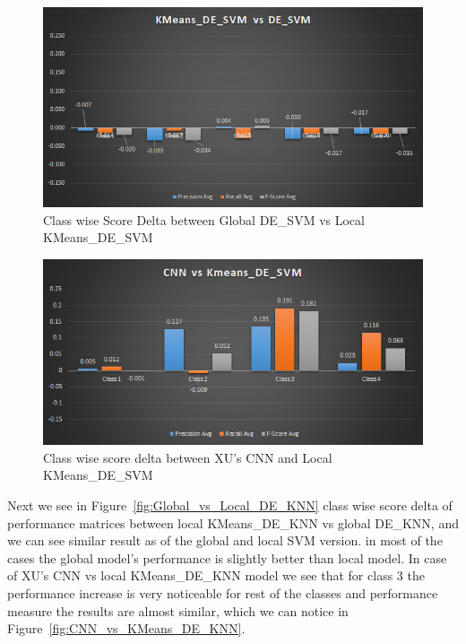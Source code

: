 \documentclass[sigconf]{acmart}
\theoremstyle{break}
\begin{document}
    \begin{figure}
        \centering
        \includegraphics[width=\linewidth]{fig/de_vs_KMenas.png}
        \caption{Class wise Score Delta between Global DE\_SVM vs Local KMeans\_DE\_SVM}
        \label{fig:Global_vs_Local_DE_SVM}
    \end{figure}
    
    \begin{figure}
        \centering
        \includegraphics[width=\linewidth]{fig/cnn_vs_Kmeans.png}
        \caption{Class wise score delta between XU's CNN and Local KMeans\_DE\_SVM}
        \label{fig:CNN_vs_KMeans_DE_SVM}
    \end{figure}
    
    Next we see in Figure~\ref{fig:Global_vs_Local_DE_KNN} class wise score delta of performance matrices between local KMeans\_DE\_KNN vs global DE\_KNN, and we can see similar result as of the global and local SVM version. in most of the cases the global model's performance is slightly better than local model. In case of XU's CNN vs local KMeans\_DE\_KNN model we see that for class 3 the performance increase is very noticeable for rest of the classes and performance measure the results are almost similar, which we can notice in Figure~\ref{fig:CNN_vs_KMeans_DE_KNN}.
    
\end{document}
